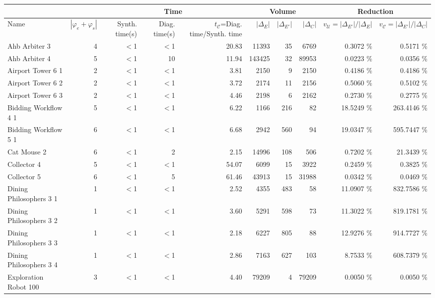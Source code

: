 \begin{tabular}{|l|r|rrr|rrr|rr|}
  \hline & & \multicolumn{3}{c|}{Time}&\multicolumn{3}{c|}{Volume} & \multicolumn{2}{c|}{Reduction}\\ \hline
Name & $|\varphi_e + \varphi_s|$ & Synth. time(s) & Diag. time(s) & $t_{\mathcal{C}}$=Diag. time/Synth. time & $|\Delta_E|$ & $|\Delta_{E'}|$ & $|\Delta_{C}|$ & $v_{\mathcal{U}}=|\Delta_{E'}|/|\Delta_{E}|$ & $v_{\mathcal{C}}=|\Delta_{E'}|/|\Delta_{C}|$ \\ 
  \hline
Ahb Arbiter 3 &   4 & $<$1 & $<$1 & 20.83 & 11393 &  35 & 6769 &  0.3072 \% &    0.5171 \% \\ 
  Ahb Arbiter 4 &   5 & $<$1 & 10 & 11.94 & 143425 &  32 & 89953 &  0.0223 \% &    0.0356 \% \\ 
  Airport Tower 6 1 &   2 & $<$1 & $<$1 & 3.81 & 2150 &   9 & 2150 &  0.4186 \% &    0.4186 \% \\ 
  Airport Tower 6 2 &   2 & $<$1 & $<$1 & 3.72 & 2174 &  11 & 2156 &  0.5060 \% &    0.5102 \% \\ 
  Airport Tower 6 3 &   2 & $<$1 & $<$1 & 4.46 & 2198 &   6 & 2162 &  0.2730 \% &    0.2775 \% \\ 
  Bidding Workflow 4 1 &   5 & $<$1 & $<$1 & 6.22 & 1166 & 216 &  82 & 18.5249 \% &  263.4146 \% \\ 
  Bidding Workflow 5 1 &   6 & $<$1 & $<$1 & 6.68 & 2942 & 560 &  94 & 19.0347 \% &  595.7447 \% \\ 
  Cat Mouse 2 &   6 & $<$1 & 2 & 2.15 & 14996 & 108 & 506 &  0.7202 \% &   21.3439 \% \\ 
  Collector 4 &   5 & $<$1 & $<$1 & 54.07 & 6099 &  15 & 3922 &  0.2459 \% &    0.3825 \% \\ 
  Collector 5 &   6 & $<$1 & 5 & 61.46 & 43913 &  15 & 31988 &  0.0342 \% &    0.0469 \% \\ 
  Dining Philosophers 3 1 &   1 & $<$1 & $<$1 & 2.52 & 4355 & 483 &  58 & 11.0907 \% &  832.7586 \% \\ 
  Dining Philosophers 3 2 &   1 & $<$1 & $<$1 & 3.60 & 5291 & 598 &  73 & 11.3022 \% &  819.1781 \% \\ 
  Dining Philosophers 3 3 &   1 & $<$1 & $<$1 & 2.18 & 6227 & 805 &  88 & 12.9276 \% &  914.7727 \% \\ 
  Dining Philosophers 3 4 &   1 & $<$1 & $<$1 & 2.86 & 7163 & 627 & 103 &  8.7533 \% &  608.7379 \% \\ 
  Exploration Robot 100 &   3 & $<$1 & $<$1 & 4.40 & 79209 &   4 & 79209 &  0.0050 \% &    0.0050 \% \\ 

\end{tabular}
